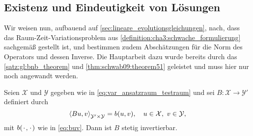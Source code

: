 \subsection{Existenz und Eindeutigkeit von Lösungen} %
\label{sub:existenz_und_eindeutigkeit_von_l_sungen}

Wir weisen nun, aufbauend auf \cref{sec:lineare_evolutionsgleichungen}, nach, dass das Raum-Zeit-Variationsproblem aus \cref{definition:cha3:schwache_formulierung} sachgemäß gestellt ist, und bestimmen zudem Abschätzungen für die Norm des Operators und dessen Inverse.
Die Hauptarbeit dazu wurde bereits durch das \cref{satz:gl:bnb_theorem} und \cref{thm:schwab09:theorem51} geleistet und muss hier nur noch angewandt werden.


\begin{Korollar}
\label{korollar:2.2}
    Seien $\mathcal X$ und $\mathcal Y$ gegeben wie in \cref{eq:var_ansatzraum_testraum} und sei $B \colon \mathcal X \to \mathcal Y'$ definiert durch
    \begin{equation}
        \left\langle Bu,v\right\rangle_{\mathcal Y' \times \mathcal Y}  = b(u, v), \quad u \in \mathcal X,~ v \in \mathcal Y,
    \end{equation}
    mit $b({\mkern2mu\cdot\mkern2mu}, {\mkern2mu\cdot\mkern2mu})$ wie in \cref{eq:buv}.
    Dann ist $B$ stetig invertierbar.
\end{Korollar}

